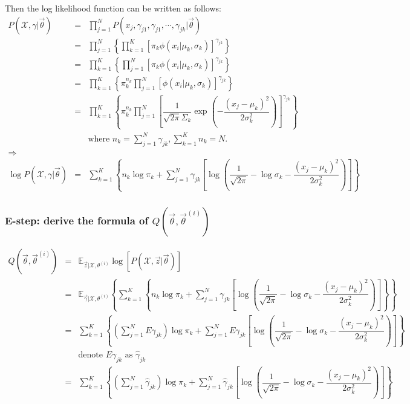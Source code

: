 Then the log likelihood function can be written as follows:
\begin{eqnarray}
P(\mathcal{X},\gamma|\vec{\theta}) &=& \prod\limits_{j=1}^N P(x_j,\gamma_{j1},\gamma_{j1},\cdots,\gamma_{jk}|\vec{\theta})\nonumber \\
       &=& \prod\limits_{j=1}^N\left\{\prod\limits_{k=1}^K\left[\pi_k\phi(x_i|\mu_k,\sigma_k)\right]^{\gamma_{jk}}\right\} \nonumber \\
	   &=& \prod\limits_{k=1}^K\left\{\prod\limits_{j=1}^N\left[\pi_k\phi(x_i|\mu_k,\sigma_k)\right]^{\gamma_{jk}}\right\} \nonumber \\
	   &=& \prod\limits_{k=1}^K\left\{\pi_k^{n_k}\prod\limits_{j=1}^N\left[\phi(x_i|\mu_k,\sigma_k)\right]^{\gamma_{jk}}\right\} \nonumber \\
	   &=& \prod\limits_{k=1}^K\left\{\pi_k^{n_k}\prod\limits_{j=1}^N\left[\dfrac{1}{\sqrt{2\pi}\Sigma_k}\exp{\left(-\dfrac{\left(x_j-\mu_k\right)^2}{2\sigma_k^2}\right)}\right]^{\gamma_{jk}}\right\} \nonumber \\
	   && \text{where } n_k=\sum\limits_{j=1}^N{\gamma_{jk}}, \sum\limits_{k=1}^K{n_k}=N. \nonumber \\
\Rightarrow \nonumber \\
\log{P(\mathcal{X},\gamma|\vec{\theta})} &=& \sum\limits_{k=1}^K\left\{n_k\log\pi_k+\sum\limits_{j=1}^N{\gamma_{jk}\left[\log(\dfrac{1}{\sqrt{2\pi}}-\log\sigma_k-\dfrac{\left(x_j-\mu_k\right)^2}{2\sigma_k^2})\right]}\right\}
\end{eqnarray}


\subsubsection{E-step: derive the formula of $Q(\vec{\theta}, \vec{\theta}^{(i)})$}
\begin{eqnarray}
Q(\vec{\theta}, \vec{\theta}^{(i)}) &=& \mathbb{E}_{\vec{z}|\mathcal{X},\theta^{(i)}}\log\left[P(\mathcal{X},\vec{z}|\vec{\theta})\right] \nonumber \\
    &=& \mathbb{E}_{\vec{\gamma}|\mathcal{X},\theta^{(i)}}\left\{\sum\limits_{k=1}^K\left\{n_k\log\pi_k+\sum\limits_{j=1}^N{\gamma_{jk}\left[\log(\dfrac{1}{\sqrt{2\pi}}-\log\sigma_k-\dfrac{\left(x_j-\mu_k\right)^2}{2\sigma_k^2})\right]}\right\}\right\} \nonumber \\
	&=& \sum\limits_{k=1}^K\left\{\left(\sum\limits_{j=1}^N{E\gamma_{jk}}\right)\log\pi_k+\sum\limits_{j=1}^N{E\gamma_{jk}\left[\log(\dfrac{1}{\sqrt{2\pi}}-\log\sigma_k-\dfrac{\left(x_j-\mu_k\right)^2}{2\sigma_k^2})\right]}\right\} \nonumber \\
	&& \text{denote } E\gamma_{jk} \text{ as } \hat{\gamma}_{jk} \nonumber \\
	&=& \sum\limits_{k=1}^K\left\{\left(\sum\limits_{j=1}^N{\hat{\gamma}_{jk}}\right)\log\pi_k+\sum\limits_{j=1}^N{\hat{\gamma}_{jk}\left[\log(\dfrac{1}{\sqrt{2\pi}}-\log\sigma_k-\dfrac{\left(x_j-\mu_k\right)^2}{2\sigma_k^2})\right]}\right\} \label{eqn:Q-function} \label{eqn:Q-function}
\end{eqnarray}

